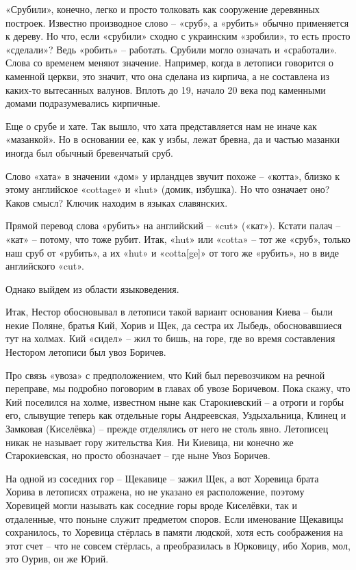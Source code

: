 «Срубили», конечно, легко и просто толковать как сооружение деревянных построек. Известно производное слово – «сруб», а «рубить» обычно применяется к дереву. Но что, если «срубили» сходно с украинским «зробили», то есть просто «сделали»? Ведь «робить» – работать. Срубили могло означать и «сработали». Слова со временем меняют значение. Например, когда в летописи говорится о каменной церкви, это значит, что она сделана из кирпича, а не составлена из каких-то вытесанных валунов. Вплоть до 19, начало 20 века под каменными домами подразумевались кирпичные.

Еще о срубе и хате. Так вышло, что хата представляется нам не иначе как «мазанкой». Но в основании ее, как у избы, лежат бревна, да и частью мазанки иногда был обычный бревенчатый сруб.

Слово «хата» в значении «дом» у ирландцев звучит похоже – «котта», близко к этому английское «cottage» и «hut» (домик, избушка). Но что означает оно? Каков смысл? Ключик находим в языках славянских.

Прямой перевод слова «рубить» на английский – «cut» («кат»). Кстати палач – «кат» – потому, что тоже рубит. Итак, «hut» или «cotta» – тот же «сруб», только наш сруб от «рубить», а их «hut» и «cotta[ge]» от того же «рубить», но в виде английского «cut».

Однако выйдем из области языковедения.

Итак, Нестор обосновывал в летописи такой вариант основания Киева – были некие Поляне, братья Кий, Хорив и Щек, да сестра их Лыбедь, обосновавшиеся тут на холмах. Кий «сидел» – жил то бишь, на горе, где во время составления Нестором летописи был увоз Боричев.

Про связь «увоза» с предположением, что Кий был перевозчиком на речной переправе, мы подробно поговорим в главах об увозе Боричевом. Пока скажу, что Кий поселился на холме, известном ныне как Старокиевский – а отроги и горбы его, слывущие теперь как отдельные горы Андреевская, Уздыхальница, Клинец и Замковая (Киселёвка) – прежде отделялись от него не столь явно. Летописец никак не называет гору жительства Кия. Ни Киевица, ни конечно же Старокиевская, но просто обозначает – где ныне Увоз Боричев.

На одной из соседних гор – Щекавице – зажил Щек, а вот Хоревица брата Хорива в летописях отражена, но не указано ея расположение, поэтому Хоревицей могли называть как соседние горы вроде Киселёвки, так и отдаленные, что поныне служит предметом споров. Если именование Щекавицы сохранилось, то Хоревица стёрлась в памяти людской, хотя есть соображения на этот счет – что не совсем стёрлась, а преобразилась в Юрковицу, ибо Хорив, мол, это Оурив, он же Юрий.

